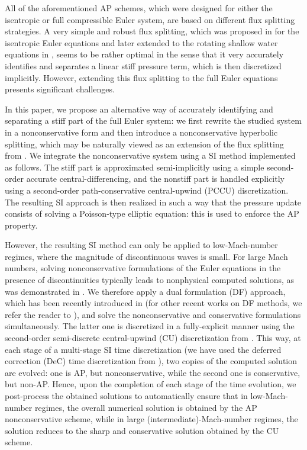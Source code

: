 \documentclass[A4paper,12pt,twoside]{article}
\numberwithin{equation}{section}
\numberwithin{figure}{section}
\numberwithin{table}{section}
\begin{document}
All of the aforementioned AP schemes, which were designed for either the isentropic or full compressible Euler system, are based on 
different flux splitting strategies.  A very simple and robust flux splitting, which was proposed in \cite{haack2012all} for the isentropic 
Euler equations and later extended to the rotating shallow water equations in \cite{LCK}, seems to be rather optimal in the sense that
it very accurately identifies and separates a linear stiff pressure term, which is then discretized implicitly. However, extending this flux
splitting to the full Euler equations presents significant challenges. 

In this paper, we propose an alternative way of accurately identifying and separating a stiff part of the full Euler system: we first
rewrite the studied system in a nonconservative form and then introduce a nonconservative hyperbolic splitting, which may be naturally
viewed as an extension of the flux splitting from \cite{haack2012all}. We integrate the nonconservative system using a SI method 
implemented as follows. The stiff part is approximated semi-implicitly using a simple second-order accurate central-differencing, and the 
nonstiff part is handled explicitly using a second-order {\color{red}path-conservative central-upwind (PCCU)} discretization. The resulting
SI approach is then realized in such a way that the pressure update consists of solving a Poisson-type elliptic equation: this is used to 
enforce the AP property.

However, the resulting SI method can only be applied to low-Mach-number regimes, where the magnitude of discontinuous waves is small.
For large Mach numbers, solving nonconservative formulations of the Euler equations in the presence of discontinuities typically leads to
nonphysical computed solutions, as was demonstrated in \cite{abgrall2010comment,HouLeF}. We therefore apply a dual formulation (DF)
approach, which has been recently introduced in \cite{CFKM} (for other recent works on DF methods, we refer the reader to
\cite{Abg2023,ACKM,AbgLiu,pidatella2019semi}), and solve the nonconservative and conservative formulations simultaneously. The latter one is
discretized in a fully-explicit manner using the second-order semi-discrete central-upwind (CU) discretization from \cite{KLin}. This way,
at each stage of a multi-stage SI time discretization (we have used the deferred correction (DeC) time discretization from
\cite{offner2025analysis}), two copies of the computed solution are evolved: one is AP, but nonconservative, while the second one is
conservative, but non-AP. Hence, upon the completion of each stage of the time evolution, we post-process the obtained solutions to
automatically ensure that in low-Mach-number regimes, the overall numerical solution is obtained by the AP nonconservative scheme, while in
large (intermediate)-Mach-number regimes, the solution reduces to the sharp and conservative solution obtained by the CU scheme.
\end{document}
